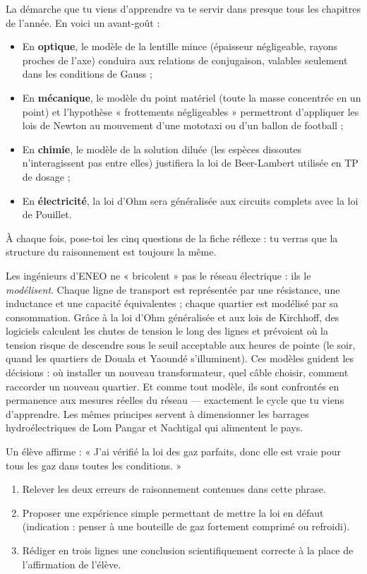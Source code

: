 \documentclass[11pt]{article}
\newcommand{\cle}[1]{{\popxbold\color{popdark}#1}}
\begin{document}
La démarche que tu viens d'apprendre va te servir dans presque tous les chapitres de l'année. En voici un avant-goût :
\begin{itemize}
\item En \textbf{optique}, le \cle{modèle de la lentille mince} (épaisseur négligeable, rayons proches de l'axe) conduira aux relations de conjugaison, valables seulement dans les conditions de Gauss ;
\item En \textbf{mécanique}, le \cle{modèle du point matériel} (toute la masse concentrée en un point) et l'hypothèse « frottements négligeables » permettront d'appliquer les lois de Newton au mouvement d'une mototaxi ou d'un ballon de football ;
\item En \textbf{chimie}, le \cle{modèle de la solution diluée} (les espèces dissoutes n'interagissent pas entre elles) justifiera la loi de Beer-Lambert utilisée en TP de dosage ;
\item En \textbf{électricité}, la loi d'Ohm sera généralisée aux circuits complets avec la loi de Pouillet.
\end{itemize}
À chaque fois, pose-toi les cinq questions de la fiche réflexe : tu verras que la structure du raisonnement est toujours la même.

\begin{savaistu}
Les ingénieurs d'ENEO ne « bricolent » pas le réseau électrique : ils le \emph{modélisent}. Chaque ligne de transport est représentée par une résistance, une inductance et une capacité équivalentes ; chaque quartier est modélisé par sa consommation. Grâce à la loi d'Ohm généralisée et aux lois de Kirchhoff, des logiciels calculent les chutes de tension le long des lignes et prévoient où la tension risque de descendre sous le seuil acceptable aux heures de pointe (le soir, quand les quartiers de Douala et Yaoundé s'illuminent). Ces modèles guident les décisions : où installer un nouveau transformateur, quel câble choisir, comment raccorder un nouveau quartier. Et comme tout modèle, ils sont confrontés en permanence aux mesures réelles du réseau — exactement le cycle que tu viens d'apprendre. Les mêmes principes servent à dimensionner les barrages hydroélectriques de Lom Pangar et Nachtigal qui alimentent le pays.
\end{savaistu}

\begin{exercice}
Un élève affirme : « J'ai vérifié la loi des gaz parfaits, donc elle est vraie pour tous les gaz dans toutes les conditions. »
\begin{enumerate}
\item Relever les deux erreurs de raisonnement contenues dans cette phrase.
\item Proposer une expérience simple permettant de mettre la loi en défaut (indication : penser à une bouteille de gaz fortement comprimé ou refroidi).
\item Rédiger en trois lignes une conclusion scientifiquement correcte à la place de l'affirmation de l'élève.
\end{enumerate}
\end{exercice}
\end{document}
